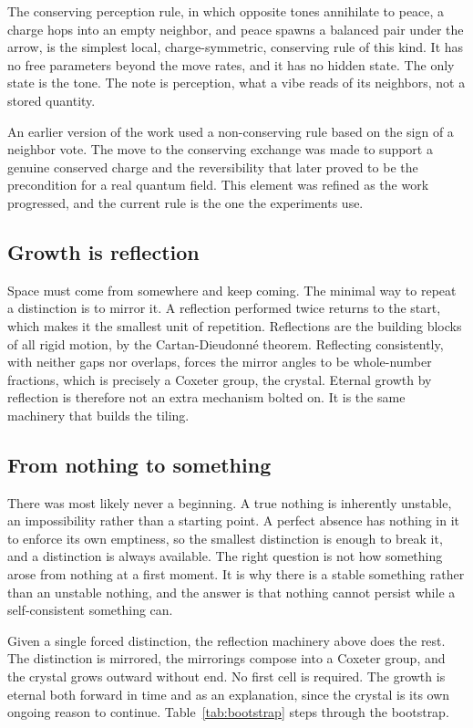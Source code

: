 The conserving perception rule, in which opposite tones annihilate to peace, a charge hops into an empty neighbor, and peace spawns a balanced pair under the arrow, is the simplest local, charge-symmetric, conserving rule of this kind. It has no free parameters beyond the move rates, and it has no hidden state. The only state is the tone. The note is perception, what a vibe reads of its neighbors, not a stored quantity.

An earlier version of the work used a non-conserving rule based on the sign of a neighbor vote. The move to the conserving exchange was made to support a genuine conserved charge and the reversibility that later proved to be the precondition for a real quantum field. This element was refined as the work progressed, and the current rule is the one the experiments use.

\subsection{Growth is reflection}

Space must come from somewhere and keep coming. The minimal way to repeat a distinction is to mirror it. A reflection performed twice returns to the start, which makes it the smallest unit of repetition. Reflections are the building blocks of all rigid motion, by the Cartan-Dieudonn\'e theorem. Reflecting consistently, with neither gaps nor overlaps, forces the mirror angles to be whole-number fractions, which is precisely a Coxeter group, the crystal. Eternal growth by reflection is therefore not an extra mechanism bolted on. It is the same machinery that builds the tiling.

\subsection{From nothing to something}

There was most likely never a beginning. A true nothing is inherently unstable, an impossibility rather than a starting point. A perfect absence has nothing in it to enforce its own emptiness, so the smallest distinction is enough to break it, and a distinction is always available. The right question is not how something arose from nothing at a first moment. It is why there is a stable something rather than an unstable nothing, and the answer is that nothing cannot persist while a self-consistent something can.

Given a single forced distinction, the reflection machinery above does the rest. The distinction is mirrored, the mirrorings compose into a Coxeter group, and the crystal grows outward without end. No first cell is required. The growth is eternal both forward in time and as an explanation, since the crystal is its own ongoing reason to continue. Table~\ref{tab:bootstrap} steps through the bootstrap.

